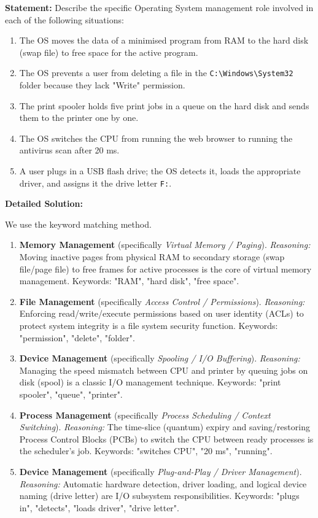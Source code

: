 \documentclass[11pt]{article}
\begin{document}
\begin{exoresolu}
\textbf{Statement:} Describe the specific Operating System management role involved in each of the following situations:
\begin{enumerate}
    \item The OS moves the data of a minimised program from RAM to the hard disk (swap file) to free space for the active program.
    \item The OS prevents a user from deleting a file in the \texttt{C:\textbackslash Windows\textbackslash System32} folder because they lack "Write" permission.
    \item The print spooler holds five print jobs in a queue on the hard disk and sends them to the printer one by one.
    \item The OS switches the CPU from running the web browser to running the antivirus scan after 20 ms.
    \item A user plugs in a USB flash drive; the OS detects it, loads the appropriate driver, and assigns it the drive letter \texttt{F:}.
\end{enumerate}
\tcblower
\textbf{Detailed Solution:}

We use the keyword matching method.

\begin{enumerate}
    \item \textbf{Memory Management} (specifically \emph{Virtual Memory / Paging}).
    \emph{Reasoning:} Moving inactive pages from physical RAM to secondary storage (swap file/page file) to free frames for active processes is the core of virtual memory management. Keywords: "RAM", "hard disk", "free space".
    \item \textbf{File Management} (specifically \emph{Access Control / Permissions}).
    \emph{Reasoning:} Enforcing read/write/execute permissions based on user identity (ACLs) to protect system integrity is a file system security function. Keywords: "permission", "delete", "folder".
    \item \textbf{Device Management} (specifically \emph{Spooling / I/O Buffering}).
    \emph{Reasoning:} Managing the speed mismatch between CPU and printer by queuing jobs on disk (spool) is a classic I/O management technique. Keywords: "print spooler", "queue", "printer".
    \item \textbf{Process Management} (specifically \emph{Process Scheduling / Context Switching}).
    \emph{Reasoning:} The time-slice (quantum) expiry and saving/restoring Process Control Blocks (PCBs) to switch the CPU between ready processes is the scheduler's job. Keywords: "switches CPU", "20 ms", "running".
    \item \textbf{Device Management} (specifically \emph{Plug-and-Play / Driver Management}).
    \emph{Reasoning:} Automatic hardware detection, driver loading, and logical device naming (drive letter) are I/O subsystem responsibilities. Keywords: "plugs in", "detects", "loads driver", "drive letter".
\end{enumerate}


\end{exoresolu}
\end{document}
